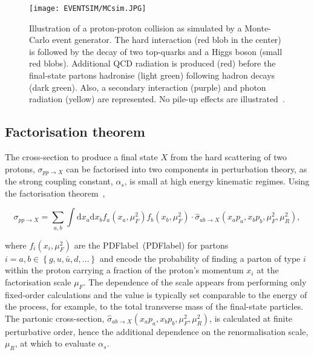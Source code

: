 \begin{figure}[htbp]
    \RawFloats
    \begin{center}
    \texttt{[image: EVENTSIM/MCsim.JPG]}
    \caption{
        Illustration of a proton-proton collision as simulated by a Monte-Carlo event generator. The hard interaction (red blob in the center) is followed by the decay of two top-quarks and a Higgs boson (small red blobs). Additional QCD radiation is produced (red) before the final-state partons hadronise (light green) following hadron decays (dark green). Also, a secondary interaction (purple) and photon radiation (yellow) are represented. No pile-up effects are illustrated~\cite{Gleisberg_2009}. 
    }
    \label{figEVNTSIM:MCsim}
    \end{center}
\end{figure}

\clearpage

\subsection{Factorisation theorem}

The cross-section to produce a final state $X$ from the hard scattering of two protons, $\sigma_{pp\to X}$ can be factorised into two components in perturbation theory, as the strong coupling constant, $\alpha_s$, is small at high energy kinematic regimes. Using the factorisation theorem~\cite{Factorisation},

\begin{equation}
    \sigma_{pp\to X}=\sum_{a,b}\int \text{d}x_a\text{d}x_b f_a(x_a,\mu_F^2)f_b(x_b,\mu_F^2)\cdot\hat{\sigma}_{ab\to X}(x_a p_a,x_b p_b,\mu_F^2,\mu_R^2),
\end{equation}

where $f_i(x_i,\mu_F^2)$ are the \acrlong{PDFlabel}~(\acrshort{PDFlabel}) for partons $i=a,b\in\left\{g, u, \bar{u}, d, ...\right\}$ and encode the probability of finding a parton of type $i$ within the proton carrying a fraction of the proton's momentum $x_i$ at the factorisation scale $\mu_F$. The dependence of the scale appears from performing only fixed-order calculations and the value is typically set comparable to the energy of the process, for example, to the total transverse mass of the final-state particles. The partonic cross-section, $\hat{\sigma}_{ab\to X}(x_a p_a,x_b p_b,\mu_F^2,\mu_R^2)$, is calculated at finite perturbative order, hence the additional dependence on the renormalisation scale, $\mu_R$, at which to evaluate $\alpha_s$.


